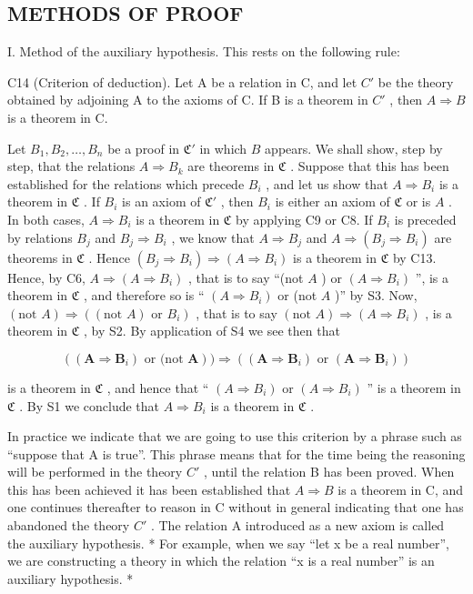 \subsection{METHODS OF PROOF}

I. Method of the auxiliary hypothesis. This rests on the following rule:

C14 (Criterion of deduction). Let A be a relation in C, and let \(C'\) be the theory obtained by adjoining A to the axioms of C. If B is a theorem in \(C'\) , then \(A \Longrightarrow B\) is a theorem in C.

Let \(B_1, B_2, \ldots, B_n\) be a proof in \(\mathfrak{C}'\) in which \(B\) appears. We shall show, step by step, that the relations \(A \Longrightarrow B_k\) are theorems in \(\mathfrak{C}\) . Suppose that this has been established for the relations which precede \(B_i\) , and let us show that \(A \Longrightarrow B_i\) is a theorem in \(\mathfrak{C}\) . If \(B_i\) is an axiom of \(\mathfrak{C}'\) , then \(B_i\) is either an axiom of \(\mathfrak{C}\) or is \(A\) . In both cases, \(A \Longrightarrow B_i\) is a theorem in \(\mathfrak{C}\) by applying C9 or C8. If \(B_i\) is preceded by relations \(B_j\) and \(B_j \Longrightarrow B_i\) , we know that \(A \Longrightarrow B_j\) and \(A \Longrightarrow (B_j \Longrightarrow B_i)\) are theorems in \(\mathfrak{C}\) . Hence \((B_j \Longrightarrow B_i) \Longrightarrow (A \Longrightarrow B_i)\) is a theorem in \(\mathfrak{C}\) by C13. Hence, by C6, \(A \Longrightarrow (A \Longrightarrow B_i)\) , that is to say ``(not \(A\) ) or \((A \Longrightarrow B_i)\) '', is a theorem in \(\mathfrak{C}\) , and therefore so is `` \((A \Longrightarrow B_i)\) or (not \(A\) )'' by S3. Now, \((\text{not } A) \Longrightarrow ((\text{not } A) \text{ or } B_i)\) , that is to say \((\text{not } A) \Longrightarrow (A \Longrightarrow B_i)\) , is a theorem in \(\mathfrak{C}\) , by S2. By application of S4 we see then that

\[
((\mathbf {A} \Rightarrow \mathbf {B} _ {i}) \text {   or   (not   } \mathbf {A})) \Rightarrow ((\mathbf {A} \Rightarrow \mathbf {B} _ {i}) \text {   or   } (\mathbf {A} \Rightarrow \mathbf {B} _ {i}))
\]

is a theorem in \(\mathfrak{C}\) , and hence that `` \((A \Longrightarrow B_i)\) or \((A \Longrightarrow B_i)\) '' is a theorem in \(\mathfrak{C}\) . By S1 we conclude that \(A \Longrightarrow B_i\) is a theorem in \(\mathfrak{C}\) .

In practice we indicate that we are going to use this criterion by a phrase such as ``suppose that A is true''. This phrase means that for the time being the reasoning will be performed in the theory \(C'\) , until the relation B has been proved. When this has been achieved it has been established that \(A \Longrightarrow B\) is a theorem in C, and one continues thereafter to reason in C without in general indicating that one has abandoned the theory \(C'\) . The relation A introduced as a new axiom is called the auxiliary hypothesis. * For example, when we say ``let x be a real number'', we are constructing a theory in which the relation ``x is a real number'' is an auxiliary hypothesis. *


